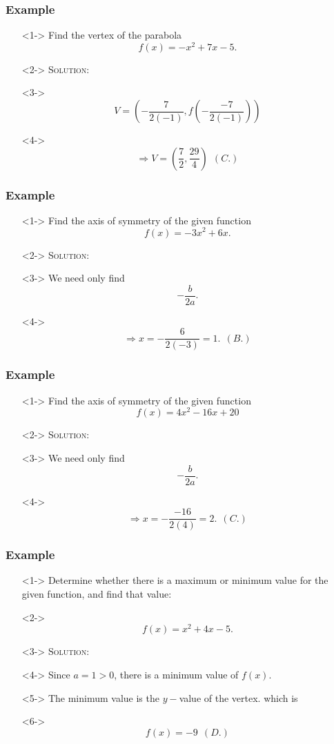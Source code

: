 \documentclass[handout]{beamer}
\begin{document}
\begin{frame}
	\frametitle{Example}
	\begin{enumerate}
		\item[]<1-> Find the vertex of the parabola 
		\[
			f(x)=-x^{2}+7x-5. 
		\]
		\item[]<2-> \textsc{Solution:} 
		\item[]<3-> \[ V= \left( -\frac{7}{2(-1)}, f \left(  -\frac{-7}{2(-1)}\right) \right) \] 
		\item[]<4-> \[ \Rightarrow V=\left( \frac{7}{2}, \frac{29}{4} \right)~~(C.) \] 
	\end{enumerate}
\end{frame}

\begin{frame}
	\frametitle{Example}
	\begin{enumerate}
		\item[]<1-> Find the axis of symmetry of the given function
		\[
			f(x)=-3x^{2}+6x. 
		\]
		\item[]<2-> \textsc{Solution:} 
		\item[]<3-> We need only find 
		\[
			-\frac{b}{2a}. 
		\]
		\item[]<4-> 
		\[
			\Rightarrow x=-\frac{6}{2(-3)}=1.~~(B.) 
		\]
	\end{enumerate}
\end{frame}

\begin{frame}
	\frametitle{Example}
	\begin{enumerate}
		\item[]<1-> Find the axis of symmetry of the given function
		\[
			f(x)=4x^{2}-16x+20
		\]
		\item[]<2-> \textsc{Solution:} 
		\item[]<3-> We need only find 
		\[
			-\frac{b}{2a}.  
		\]
		\item[]<4-> 
		\[
			\Rightarrow x=-\frac{-16}{2(4)}=2.~~(C.) 
		\]
	\end{enumerate}
\end{frame}

\begin{frame}
	\frametitle{Example}
	\begin{enumerate}
		\item[]<1-> Determine whether there is a maximum or minimum value for the given function, and find that value: 
		\item[]<2-> \[ f(x)=x^{2}+4x-5. \]
		\item[]<3-> \textsc{Solution:} 
		\item[]<4-> Since $a=1>0$, there is a minimum value of $f(x)$.  
		\item[]<5-> The minimum value is the $y-$value of the vertex. which is 
		\item[]<6-> \[ f(x)=-9~~(D.)\]
	\end{enumerate}
\end{frame}
\end{document}
